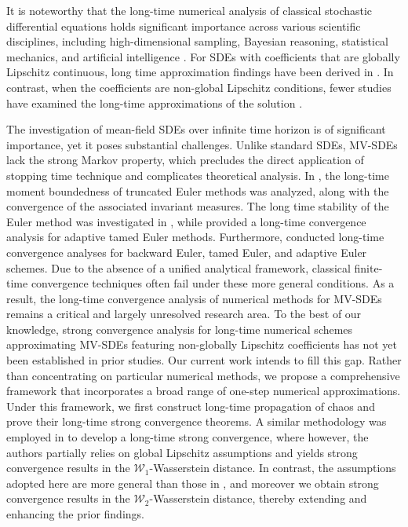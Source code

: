 \documentclass[12pt]{article}
\numberwithin{equation}{section}
\begin{document}
It is noteworthy that the long-time numerical analysis of classical  stochastic differential equations holds significant importance across various scientific disciplines, including high-dimensional sampling, Bayesian reasoning, statistical mechanics, and artificial intelligence \cite{dalalyan2017theoretical, hong2019invariant, song2020score}. For SDEs with coefficients that are globally Lipschitz continuous, long time  approximation findings have been derived in \cite{mattingly2010convergence, talay1990second, talay2002stochastic}. In contrast, when the coefficients are  non-global Lipschitz conditions, fewer  studies have examined the long-time approximations of the solution \cite{liu2023backward, WANG2024long-timeStrong, angeli2023uniform, crisan2021uniform}.

The investigation   of  mean-field SDEs over  infinite time horizon is of significant importance, yet it poses substantial challenges. Unlike standard SDEs, MV-SDEs lack the strong Markov property, which precludes the direct application of stopping time technique  and complicates theoretical analysis. In \cite{yuanping2024explicit}, the long-time moment boundedness of truncated Euler methods was analyzed, along with the convergence of the associated invariant measures. The long time  stability of the Euler method was investigated in \cite{liu2023stability}, while \cite{tran2025infinite} provided a long-time convergence analysis for adaptive tamed Euler methods. Furthermore, \cite{bao2024uniform} conducted long-time convergence analyses for backward Euler, tamed Euler, and adaptive Euler schemes. Due to the absence of a unified analytical framework, classical finite-time convergence techniques often fail under these more general conditions. As a result, the long-time convergence analysis of numerical methods for MV-SDEs remains a critical and largely unresolved research area.   
To the best of our knowledge,   strong convergence analysis  for long-time numerical schemes approximating MV-SDEs featuring non-globally Lipschitz  coefficients has not yet been established in prior studies.  Our current work intends to fill this gap. 
Rather than concentrating on particular numerical methods, we propose a comprehensive framework that incorporates a broad range of one-step numerical approximations. Under this framework, we first construct  long-time propagation of chaos and prove their 
long-time strong convergence theorems. A similar methodology was employed in \cite{bao2024uniform} to develop a long-time strong convergence, where  however, the authors  partially relies on global Lipschitz assumptions and yields strong convergence results in the $\mathcal{W}_1$-Wasserstein distance. In contrast, the assumptions adopted here are more general than those in \cite{bao2024uniform}, and moreover  we obtain strong convergence results in the $\mathcal{W}_2$-Wasserstein distance, thereby extending and enhancing the prior findings.
 
\end{document}

